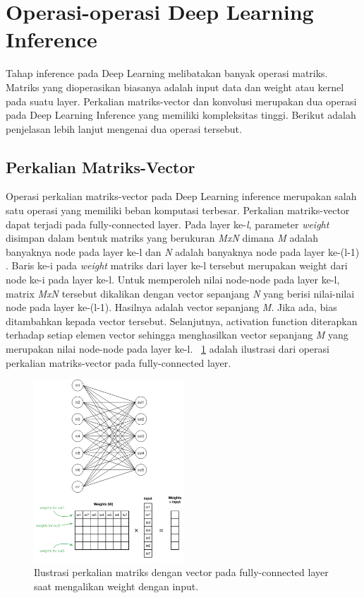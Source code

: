 \section{Operasi-operasi Deep Learning Inference}
Tahap inference pada Deep Learning melibatakan banyak operasi matriks. Matriks yang dioperasikan biasanya adalah input data dan weight atau kernel pada suatu layer. Perkalian matriks-vector dan konvolusi merupakan dua operasi pada Deep Learning Inference yang memiliki kompleksitas tinggi. Berikut adalah penjelasan lebih lanjut mengenai dua operasi tersebut.

\subsection{Perkalian Matriks-Vector}
Operasi perkalian matriks-vector pada Deep Learning inference merupakan salah satu operasi yang memiliki beban komputasi terbesar. Perkalian matriks-vector dapat terjadi pada fully-connected layer. Pada layer ke-\textit{l}, parameter \textit{weight} disimpan dalam bentuk matriks yang berukuran \textit{MxN} dimana \textit{M} adalah banyaknya node pada layer ke-l dan \textit{N} adalah banyaknya node pada layer ke-(l-1) \cite{deeplearningmatrix}. Baris ke-i pada \textit{weight} matriks dari layer ke-l tersebut merupakan weight dari node ke-i pada layer ke-l. Untuk memperoleh nilai node-node pada layer ke-l, matrix \textit{MxN} tersebut dikalikan dengan vector sepanjang \textit{N} yang berisi nilai-nilai node pada layer ke-(l-1). Hasilnya adalah vector sepanjang \textit{M}. Jika ada, bias ditambahkan kepada vector tersebut. Selanjutnya, activation function diterapkan terhadap setiap elemen vector sehingga menghasilkan vector sepanjang \textit{M} yang merupakan nilai node-node pada layer ke-l. \pic~\ref{fig:fcmatmul} adalah ilustrasi dari operasi perkalian matriks-vector pada fully-connected layer.

\begin{figure}
	\centering
	\includegraphics[width=0.50\textwidth]
	{pics/fcmatmul.png}
	\caption{Ilustrasi perkalian matriks dengan vector pada fully-connected layer saat mengalikan weight dengan input.}
	\label{fig:fcmatmul}
\end{figure}

